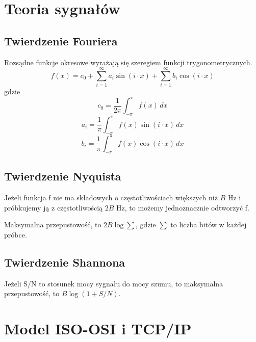\documentclass[]{article}
\begin{document}
\onehalfspacing

\fancyhead[C]{\thepage}
\tableofcontents
\section{Teoria sygnałów}
\subsection{Twierdzenie Fouriera}
    Rozsądne funkcje okresowe wyrażają się szeregiem funkcji trygonometrycznych.
   \[ f(x) = c_0 + \sum_{i=1}^{\infty} a_i \sin(i \cdot x) + \sum_{i=1}^{\infty} b_i \cos(i \cdot x) \]
gdzie
\[ c_0 = \frac{1}{2\pi} \int_{-\pi}^{\pi} f(x) \, dx \]
\[ a_i = \frac{1}{\pi} \int_{-\pi}^{\pi} f(x) \sin(i \cdot x) \, dx \]
\[ b_i = \frac{1}{\pi} \int_{-\pi}^{\pi} f(x) \cos(i \cdot x) \, dx \]

\subsection{Twierdzenie Nyquista}
Jeżeli funkcja f nie ma składowych o częstotliwościach większych niż $B$  Hz i próbkujemy ją z częstotliwością $2B$ Hz, to możemy jednoznacznie odtworzyć f.
    
\noindent
Maksymalna przepustowość, to $2B\log\sum$, gdzie $\sum$ to liczba bitów w każdej próbce.
\subsection{Twierdzenie Shannona}
Jeżeli S/N to stosunek mocy sygnału do mocy szumu, to maksymalna przepustowość, to \linebreak $B\log(1+S/N)$.
\newpage
\section{Model ISO-OSI i TCP/IP}
\end{document}
